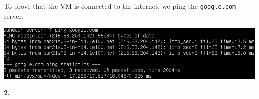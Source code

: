 \documentclass[12pt]{extarticle}
\begin{document}
To prove that the VM is connected to the internet, we ping the \texttt{google.com} server.
\begin{center}
\includegraphics[scale=0.5]{resources/1-1-3.png}\\
\end{center}

\textbf{2.} 
\end{document}

